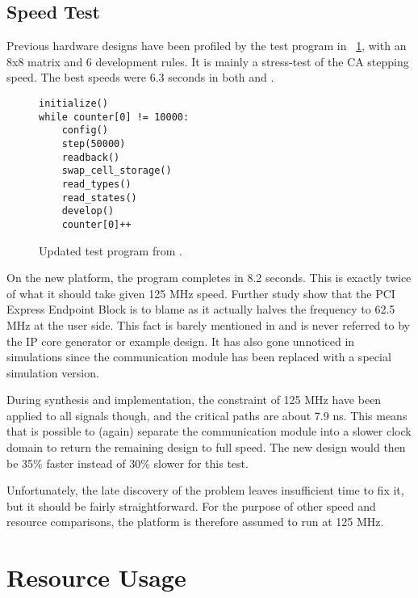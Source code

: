 \subsection{Speed Test}

Previous hardware designs have been profiled by the test program in \figurename~\ref{fig:test-program}, with an 8x8 matrix and 6 development rules.
It is mainly a stress-test of the CA stepping speed.
The best speeds were 6.3 seconds in both \cite{djupdal2003sblock} and \cite{stovneng2014sblock}.

\begin{figure}[!ht]
\begin{lstlisting}[xleftmargin=0.34\textwidth]
initialize()
while counter[0] != 10000:
    config()
    step(50000)
    readback()
    swap_cell_storage()
    read_types()
    read_states()
    develop()
    counter[0]++
\end{lstlisting}
\caption[Test program] {
    Updated test program from \cite{djupdal2003sblock}.
}
\label{fig:test-program}
\end{figure}

On the new platform, the program completes in 8.2 seconds.
This is exactly twice of what it should take given 125 MHz speed.
Further study show that the PCI Express Endpoint Block is to blame as it actually halves the frequency to 62.5 MHz at the user side.
This fact is barely mentioned in \cite{ug672} and is never referred to by the IP core generator or example design.
It has also gone unnoticed in simulations since the communication module has been replaced with a special simulation version.

During synthesis and implementation, the constraint of 125 MHz have been applied to all signals though, and the critical paths are about 7.9 ns.
This means that is possible to (again) separate the communication module into a slower clock domain to return the remaining design to full speed.
The new design would then be 35\% faster instead of 30\% slower for this test.

Unfortunately, the late discovery of the problem leaves insufficient time to fix it, but it should be fairly straightforward.
For the purpose of other speed and resource comparisons, the platform is therefore assumed to run at 125 MHz.


\section{Resource Usage}

